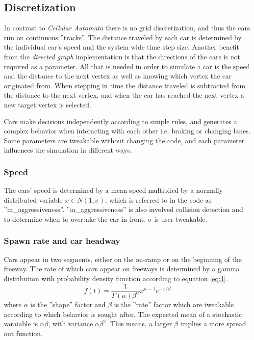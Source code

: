 \documentclass{article}
\begin{document}
  \subsection{Discretization}
    In contrast to \textit{Cellular Automata}
    there is no grid discretization, and thus the cars run on continuous ''tracks''.
    The distance traveled by each car is determined by the individual car's speed and
    the system wide time step size.
    Another benefit from the \textit{directed graph} implementation is that
    the directions of the cars is not required as a parameter. All that is needed in
    order to simulate a car is the speed and the distance
    to the next vertex as well as knowing which vertex the car originated from.
    When stepping in time the distance traveled is subtracted from the distance to the next vertex, and
    when the car has reached the next vertex a new target vertex is selected.

    Cars make decisions independently according to simple rules, and generates
    a complex behavior when interacting with each other i.e. braking or changing lanes.
    Some parameters are tweakable without changing the code, and each parameter
    influences the simulation in different ways.
    \subsubsection{Speed}
      The cars' speed is determined by a mean speed multiplied by a normally distributed
      variable $x \in N(1,\sigma)$, which is referred to in the code as
      ''m\_aggressiveness''. ''m\_aggressiveness'' is also involved collision detection
      and to determine when to overtake the car in front. $\sigma$ is user tweakable.
    \subsubsection{Spawn rate and car headway}
      Cars appear in two segments, either on the on-ramp or on the beginning of the freeway.
      The rate of
      which cars appear on freeways is determined by a gamma distribution
      with probability density function according to equation \ref{eq:1}. \cite{abdel-rahim_ce571:_nodate}
      \begin{equation}
        f(t) = \frac{1}{\Gamma(\alpha)\beta^{\alpha}}x^{\alpha-1}e^{-x/\beta}
        \label{eq:1}
      \end{equation}
      where $\alpha$ is the ''shape'' factor and $\beta$ is the ''rate'' factor which are
      tweakable according to which behavior is sought after. The expected mean of a
      stochastic varaiable is $\alpha\beta$, with variance $\alpha\beta^{2}$.
      This means, a larger $\beta$ implies a more spread out function.
\end{document}
